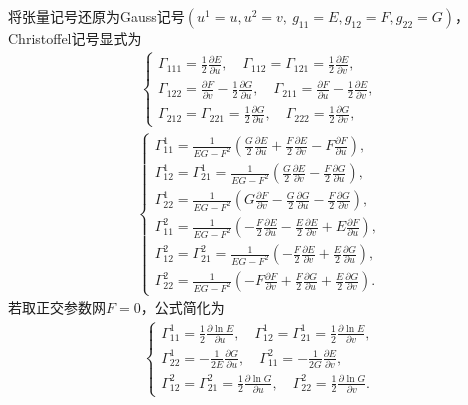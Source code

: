 \documentclass[../../main.tex]{subfiles}%
\begin{document}
\begin{remark}
将张量记号还原为Gauss记号$(u^1=u,u^2=v,\ g_{11}=E,g_{12}=F,g_{22}=G)$，Christoffel记号显式为
\begin{align}
\begin{cases}
\Gamma_{111}=\frac{1}{2}\frac{\partial E}{\partial u},\quad \Gamma_{112}=\Gamma_{121}=\frac{1}{2}\frac{\partial E}{\partial v},\\
\Gamma_{122}=\frac{\partial F}{\partial v}-\frac{1}{2}\frac{\partial G}{\partial u},\quad \Gamma_{211}=\frac{\partial F}{\partial u}-\frac{1}{2}\frac{\partial E}{\partial v},\\
\Gamma_{212}=\Gamma_{221}=\frac{1}{2}\frac{\partial G}{\partial u},\quad \Gamma_{222}=\frac{1}{2}\frac{\partial G}{\partial v},
\end{cases}\label{eq:christoffel_gauss_low}
\end{align}
\begin{align}
\begin{cases}
\Gamma^1_{11}=\frac{1}{EG-F^2}\left(\frac{G}{2}\frac{\partial E}{\partial u}+\frac{F}{2}\frac{\partial E}{\partial v}-F\frac{\partial F}{\partial u}\right),\\
\Gamma^1_{12}=\Gamma^1_{21}=\frac{1}{EG-F^2}\left(\frac{G}{2}\frac{\partial E}{\partial v}-\frac{F}{2}\frac{\partial G}{\partial u}\right),\\
\Gamma^1_{22}=\frac{1}{EG-F^2}\left(G\frac{\partial F}{\partial v}-\frac{G}{2}\frac{\partial G}{\partial u}-\frac{F}{2}\frac{\partial G}{\partial v}\right),\\
\Gamma^2_{11}=\frac{1}{EG-F^2}\left(-\frac{F}{2}\frac{\partial E}{\partial u}-\frac{E}{2}\frac{\partial E}{\partial v}+E\frac{\partial F}{\partial u}\right),\\
\Gamma^2_{12}=\Gamma^2_{21}=\frac{1}{EG-F^2}\left(-\frac{F}{2}\frac{\partial E}{\partial v}+\frac{E}{2}\frac{\partial G}{\partial u}\right),\\
\Gamma^2_{22}=\frac{1}{EG-F^2}\left(-F\frac{\partial F}{\partial v}+\frac{F}{2}\frac{\partial G}{\partial u}+\frac{E}{2}\frac{\partial G}{\partial v}\right).
\end{cases}\label{eq:christoffel_gauss_up}
\end{align}
若取正交参数网$F=0$，公式简化为
\begin{align}
\begin{cases}
\Gamma^1_{11}=\frac{1}{2}\frac{\partial \ln E}{\partial u},\quad \Gamma^1_{12}=\Gamma^1_{21}=\frac{1}{2}\frac{\partial \ln E}{\partial v},\\
\Gamma^1_{22}=-\frac{1}{2E}\frac{\partial G}{\partial u},\quad \Gamma^2_{11}=-\frac{1}{2G}\frac{\partial E}{\partial v},\\
\Gamma^2_{12}=\Gamma^2_{21}=\frac{1}{2}\frac{\partial \ln G}{\partial u},\quad \Gamma^2_{22}=\frac{1}{2}\frac{\partial \ln G}{\partial v}.
\end{cases}\label{eq:christoffel_ortho}
\end{align}
\end{remark}
\end{document}
